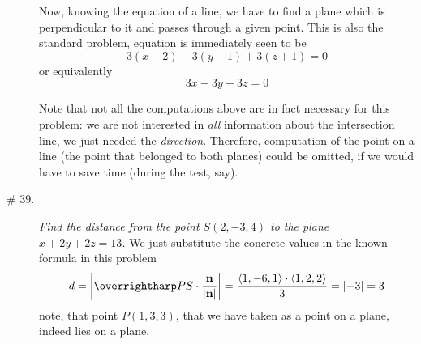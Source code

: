 \documentclass[8pt]{article} %
\begin{document}
\begin{description}
{		Now, knowing the equation of a line, we have to find a plane which is perpendicular to it and passes through a given point. 
		This is also the standard problem, equation is immediately seen to be
		\[3(x-2)-3(y-1)+3(z+1)=0\] or equivalently\[3x-3y+3z=0\]

		Note 
		that not all the computations above are in fact necessary for this problem: we are not interested in \textit{all} information about
		the intersection
		line, we just needed the \textit{direction}. Therefore, computation of the point on a line (the point that belonged to both planes)
		could be omitted, if we would have to save time (during the test, say). 
		}
	\item[\# 39.]{{\it Find the distance from the point $S(2,-3,4)$ to the plane $x+2y+2z=13$.}
		We just substitute the concrete values in the known formula in this problem
		\[d=\myabs{\myvec{PS}\cdot\frac{\mathbf{n}}{\myabs{\mathbf{n}}}}=\frac{\left<1,-6,1\right>\cdot\left<1,2,2\right>}{3}=\myabs{-3}=3\]
		note, that point $P(1,3,3)$, that we have taken as a point on a plane, indeed lies on a plane. 
		}
\end{description}
\end{document}
